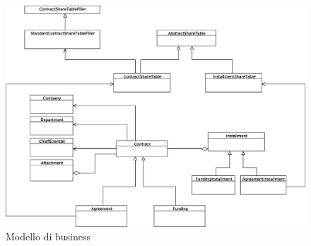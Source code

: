\begin{figure}[h]
  \caption{Modello di business}
  \label{model_business}
  \centering
    \includegraphics[width=1\textwidth]{images/modello_business.eps}
\end{figure}
